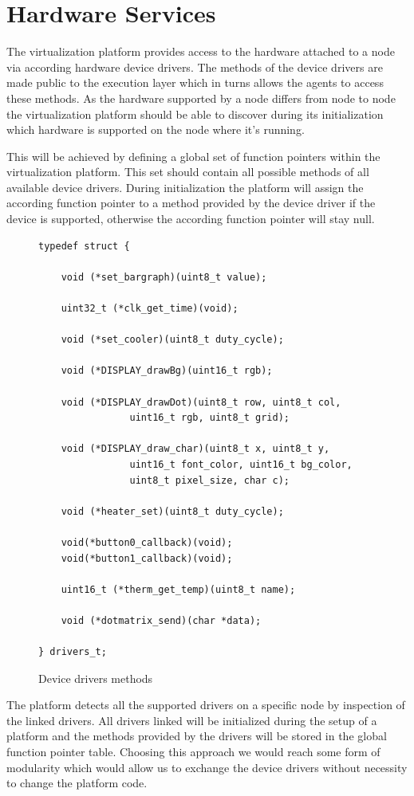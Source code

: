 \documentclass{scrreprt}
\begin{document}
\section{Hardware Services}

The virtualization platform provides access to the hardware attached to a node via according hardware 
device drivers. The methods of the device drivers are made public to the execution layer which in turns 
allows the agents to access these methods. As the hardware supported by a node differs from node to node 
the virtualization platform should be able to discover during its initialization which hardware is supported 
on the node where it’s running. 


\noindent
This will be achieved by defining a global set of function pointers within the virtualization platform. 
This set should contain all possible methods of all available device drivers. During initialization the platform 
will assign the according function pointer to a method provided by the device driver if the device is supported, 
otherwise the according function pointer will stay null. 

\begin{figure}[!htb]
\lstset{language=C}
\begin{lstlisting}[frame=single]
typedef struct {

	void (*set_bargraph)(uint8_t value);

	uint32_t (*clk_get_time)(void);

	void (*set_cooler)(uint8_t duty_cycle);

	void (*DISPLAY_drawBg)(uint16_t rgb);

	void (*DISPLAY_drawDot)(uint8_t row, uint8_t col,
				uint16_t rgb, uint8_t grid);

	void (*DISPLAY_draw_char)(uint8_t x, uint8_t y, 
				uint16_t font_color, uint16_t bg_color, 
				uint8_t pixel_size, char c);
				
	void (*heater_set)(uint8_t duty_cycle);

	void(*button0_callback)(void);
	void(*button1_callback)(void);

	uint16_t (*therm_get_temp)(uint8_t name);

	void (*dotmatrix_send)(char *data);

} drivers_t;
\end{lstlisting}
\caption{Device drivers methods}
\label{fig:devicedrivers}
\end{figure}

\noindent
The platform detects all the supported drivers on a specific node by inspection of the linked drivers.
All drivers linked will be initialized during the setup of a platform and the methods provided by the 
drivers will be stored in the global function pointer table.
Choosing this approach we would reach some form of modularity which would allow us to exchange 
the device drivers without necessity to change the platform code.
\end{document}
